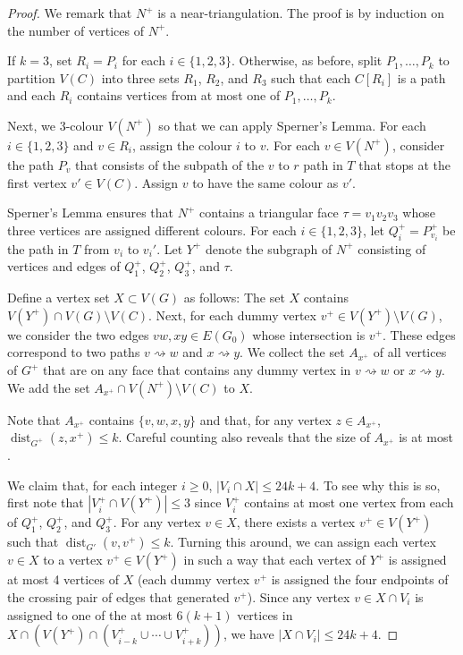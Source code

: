 \documentclass{patmorin}
\DeclareMathOperator{\dist}{dist}
\begin{document}
\begin{proof}
  We remark that $N^+$ is a near-triangulation.
  The proof is by induction on the number of vertices of $N^+$.

  If $k=3$, set $R_i=P_i$ for each $i\in\{1,2,3\}$.  Otherwise, as before, split $P_1,\ldots,P_k$ to partition $V(C)$ into three sets $R_1$, $R_2$, and $R_3$ such that each $C[R_i]$ is a path and each $R_i$ contains vertices from at most one of $P_1,\ldots,P_k$. 
  
  Next, we 3-colour $V(N^+)$ so that we can apply Sperner's Lemma.
  For each $i\in\{1,2,3\}$ and $v\in R_i$, assign the colour $i$ to $v$.
  For each $v\in V(N^+)$, consider the path $P_v$ that consists of the subpath of the $v$ to $r$ path in $T$ that stops at the first vertex $v'\in V(C)$. Assign $v$ to have the same colour as $v'$.
  
  Sperner's Lemma ensures that $N^+$ contains a triangular face $\tau=v_1v_2v_3$ whose three vertices are assigned different colours. For each $i\in\{1,2,3\}$, let $Q_i^+=P_{v_i}^+$ be the path in $T$ from $v_i$ to $v_i'$.  Let $Y^+$ denote the subgraph of $N^+$ consisting of vertices and edges of $Q_1^+$, $Q_2^+$, $Q_3^+$, and $\tau$.
  
  Define a vertex set $X\subset V(G)$ as follows:  The set $X$ contains $V(Y^+)\cap V(G)\setminus V(C)$.  Next, for each dummy vertex $v^+\in V(Y^+)\setminus V(G)$, we consider the two edges $vw,xy\in E(G_0)$ whose intersection is $v^+$.  These edges correspond to two paths $v\rightsquigarrow w$ and $x\rightsquigarrow y$.  We collect the set $A_{x^+}$ of all vertices of $G^+$ that are on any face that contains any dummy vertex in $v\rightsquigarrow w$ or $x\rightsquigarrow y$.  We add the set $A_{x^+}\cap V(N^+)\setminus V(C)$ to $X$.  
  
  Note that $A_{x^+}$ contains $\{v,w,x,y\}$ and that, for any vertex $z\in A_{x^+}$, $\dist_{G^+}(z,x^+) \le k$.  Careful counting also reveals that the size of $A_{x^+}$ is at most .
    
  We claim that, for each integer $i\ge 0$, $|V_i\cap X|\le 24k+4$.  To see why this is so, first note that $|V_i^+\cap V(Y^+)|\le 3$ since $V_i^+$ contains at most one vertex from each of $Q_1^+$, $Q_2^+$, and $Q_3^+$. For any vertex $v\in X$, there exists a vertex $v^+\in V(Y^+)$ such that $\dist_{G'}(v,v^+)\le k$.  Turning this around, we can assign each vertex $v\in X$ to a vertex $v^+\in V(Y^+)$ in such a way that each vertex of $Y^+$ is assigned at most 4 vertices of $X$ (each dummy vertex $v^+$ is assigned the four endpoints of the crossing pair of edges that generated $v^+$).  Since any vertex $v\in X\cap V_i$ is assigned to one of the at most $6(k+1)$ vertices in $X\cap (V(Y^+)\cap( V_{i-k}^+\cup\cdots\cup V_{i+k}^+))$, we have $|X\cap V_i|\le 24k+4$.


\end{proof}
\end{document}
